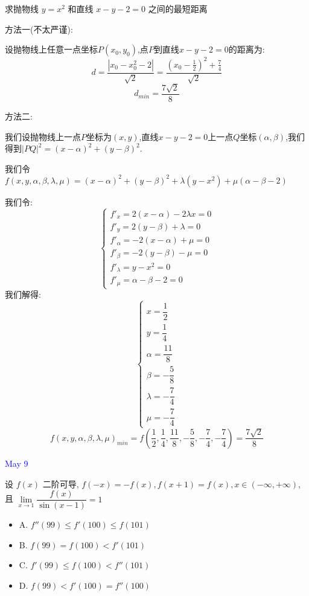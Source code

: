 \begin{example}[][Exam: 31.2.2]
	求抛物线 $y=x^2$ 和直线 $x-y-2=0$ 之间的最短距离
\end{example}

\begin{solution}
	
	方法一(不太严谨): 
	
	设抛物线上任意一点坐标$P(x_{0},y_{0})$,点$P$到直线$x-y-2=0$的距离为: 
	$$d=\dfrac{|x_{0}-x_{0}^2-2|}{\sqrt{2}}=\dfrac{(x_{0}-\frac{1}{2})^2+\frac{7}{4}}{\sqrt{2}}$$
	$$d_{min}=\dfrac{7\sqrt{2}}{8}$$
	
	方法二: 
	
	我们设抛物线上一点$P$坐标为$(x,y)$,直线$x-y-2=0$上一点$Q$坐标$(\alpha,\beta)$,我们得到$|PQ|^2=(x-\alpha)^2+(y-\beta)^2$.
	
	我们令$f(x,y,\alpha,\beta,\lambda,\mu)=(x-\alpha)^2+(y-\beta)^2+\lambda(y-x^2)+\mu(\alpha-\beta-2)$
	
	我们令: $$\left\lbrace 
	\begin{array}{l}
		f'_{x}=2(x-\alpha)-2\lambda x=0\\
		f'_{y}=2(y-\beta)+\lambda=0\\
		f'_{\alpha}=-2(x-\alpha)+\mu=0\\
		f'_{\beta}=-2(y-\beta)-\mu=0\\
		f'_{\lambda}=y-x^2=0\\
		f'_{\mu}=\alpha-\beta-2=0
	\end{array}
	\right. $$
	我们解得: $$\left\lbrace 
	\begin{array}{l}
		x=\dfrac{1}{2}\\
		y=\dfrac{1}{4}\\
		\alpha=\dfrac{11}{8}\\
		\beta=-\dfrac{5}{8}\\
		\lambda=-\dfrac{7}{4}\\
		\mu=-\dfrac{7}{4}
	\end{array}
	\right. $$
	$$f(x,y,\alpha,\beta,\lambda,\mu)_{min}=f(\dfrac{1}{2},\dfrac{1}{4},\dfrac{11}{8},-\dfrac{5}{8},-\dfrac{7}{4},-\dfrac{7}{4})=\dfrac{7\sqrt{2}}{8}$$
\end{solution}


\textcolor{blue}{May 9}

\begin{example}[][Exam: 31.2.3]
	设 $f(x)$ 二阶可导, $f(-x)=-f(x),f(x+1)=f(x),x\in(-\infty,+\infty)$, 且 $\lim\limits_{x\to 1}\dfrac{f(x)}{\sin(x-1)}=1$
\begin{itemize}
	\item A. $f''(99)\leq f'(100)\leq f(101)$ 
	\item B. $f(99)=f(100)<f'(101)$ 
	\item C. $f'(99)\leq f(100)<f''(101)$ 
	\item D. $f(99)< f'(100)=f''(100)$ 
\end{itemize}
\end{example}

